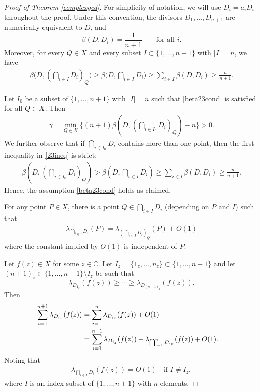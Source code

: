\documentclass[10pt]{amsart}
\numberwithin{equation}{section}
\theoremstyle{plain}
\theoremstyle{definition}
\begin{document}
  
 \begin{proof}[Proof of Theorem \ref{complexgcd}]
 For simplicity of notation, we will use $D_i=a_iD_i$ throughout the proof.    Under this convention, the divisors \(D_1,\ldots,D_{n+1}\) are numerically equivalent to \(D\), and
\[
\beta(D,D_i)=\frac{1}{n+1}
\qquad \text{for all } i.
\]
Moreover, for every \(Q\in X\) and every subset \(I \subset \{1,\ldots,n+1\}\) with \(|I|=n\), we have
\begin{align}
\label{23ineq}
\beta\bigl(D,(\textstyle\bigcap_{i \in I} D_i)_Q\bigr)
\geq \beta\bigl(D,\textstyle\bigcap_{i \in I} D_i\bigr)
\geq \sum_{i \in I}\beta(D, D_i)
\geq \frac{n}{n+1}.
\end{align}
  
  Let  $I_0$ be a  subset of  $\{1,\ldots,n+1\}$ with $|I|=n$ such that \eqref{beta23cond} is satisfied for all $Q\in X$.
Then
\begin{align}\label{gamma0}
\gamma =\min_{Q\in X }\{(n+1)\beta(D,(\bigcap_{i \in I_0} D_i)_Q) -n\}>0.
\end{align}
 We further observe that  if $\bigcap_{i\in I_0}D_i$ contains more than one point, then the first inequality in \eqref{23ineq} is strict:
\begin{align*}
\beta(D,(\bigcap_{i \in  I_0} D_i)_Q)> \beta(D,\bigcap_{i \in I} D_i)\geq \sum_{i \in I}\beta(D, D_i) \geq \frac{n}{n+1}.
\end{align*}
Hence, the assumption \eqref{beta23cond} holds as claimed.



For any point $P\in X $,  there is a point $Q\in   \bigcap_{i \in I} D_i$ (depending on $P$  and $I$) such that
\begin{align}\label{pointeq}
\lambda_{\bigcap_{i \in I} D_i }(P)=\lambda_{(\bigcap_{i \in I} D_i)_Q}(P)+O(1)
\end{align}
where the constant implied by $O(1)$ is independent of $P$.

Let $f(z)\in X$ for some $z\in \mathbb C$.
Let $I_z=\{1_z,\ldots,n_z\} \subset \{1,\ldots,n+1\}$ and let $(n+1)_z  \in\{1,\ldots,n+1\} \setminus I_z$ be such that
$$
\lambda_{ D_{1_z}}(f(z))\geq \cdots \geq \lambda_{ D_{(n+1)_z} }(f(z)).
$$
Then
\begin{align}\label{localWeil}
  \sum_{i=1}^{n+1}\lambda_{ D_{i_z}}(f(z))  
 &= \sum_{i=1}^{n}\lambda_{ D_{i_z}}(f(z)) +O(1)\cr
&= \sum_{i=1}^{n-1}\lambda_{D_{i_z}}(f(z))  +\lambda_{\bigcap_{i=1}^n  D_{i_z}}(f(z))+O(1).
\end{align}
Noting that 
\begin{align}\label{intertrivial} 
\lambda_{\bigcap_{i \in I}  D_{i }}  (f(z)) =O(1)\quad  \text{if $I \neq I_z$},
\end{align}
where $I$ is an index subset of $\{1,\hdots,n+1\}$ with $n$ elements.
 

\end{proof}
\end{document}
